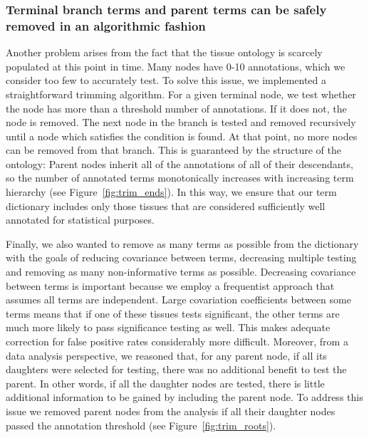 \documentclass{bmcart}
\begin{document}
\subsubsection*{Terminal branch terms and parent terms can be safely removed in an algorithmic fashion }
Another problem arises from the fact that the tissue ontology is scarcely populated at this point in time. Many nodes have 0-10 annotations, which we consider too few to accurately test. To solve this issue, we implemented a straightforward trimming algorithm. For a given terminal node, we test whether the node has more than a threshold number of annotations. If it does not, the node is removed. The next node in the branch is tested and removed recursively until a node which satisfies the condition is found. At that point, no more nodes can be removed from that branch. This is guaranteed by the structure of the ontology: Parent nodes inherit all of the annotations of all of their descendants, so the number of annotated terms monotonically increases with increasing term hierarchy (see Figure~\ref{fig:trim_ends}). In this way, we ensure that our term dictionary includes only those tissues that are considered sufficiently well annotated for statistical purposes.

	Finally, we also wanted to remove as many terms as possible from the dictionary with the goals of reducing covariance between terms, decreasing multiple testing and removing as many non-informative terms as possible. Decreasing covariance between terms is important because we employ a frequentist approach that assumes all terms are independent. Large covariation coefficients between some terms means that if one of these tissues tests significant, the other terms are much more likely to pass significance testing as well. This makes adequate correction for false positive rates considerably more difficult. Moreover, from a data analysis perspective, we reasoned that, for any parent node, if all its daughters were selected for testing, there was no additional benefit to test the parent. In other words, if all the daughter nodes are tested, there is little additional information to be gained by including the parent node.  To address this issue we removed parent nodes from the analysis if all their daughter nodes passed the annotation threshold (see Figure~\ref{fig:trim_roots}).
\end{document}
